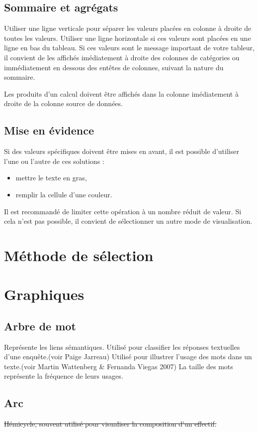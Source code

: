 \documentclass[a4paper,12pt]{article}
\begin{document}
\begin{multicols}{2}
\subsection*{Sommaire et agrégats}
\label{sec:org45b869e}
Utiliser une ligne verticale pour séparer les valeurs placées en colonne à droite de toutes les valeurs.
Utiliser une ligne horizontale si ces valeurs sont placées en une ligne en bas du tableau.
Si ces valeurs sont le message important de votre tableur, il convient de les affichés imédiatement à droite des colonnes de catégories ou immédiatement en dessous des entêtes de colonnes, suivant la nature du sommaire.

Les produits d'un calcul doivent être affichés dans la colonne imédiatement à droite de la colonne source de données.
\subsection*{Mise en évidence}
\label{sec:org15b8485}
Si des valeurs spécifiques doivent être mises en avant, il est possible d'utiliser l'une ou l'autre de ces solutions :
\begin{itemize}
\item mettre le texte en gras,
\item remplir la cellule d'une couleur.
\end{itemize}
Il est recommandé de limiter cette opération à un nombre réduit de valeur. Si cela n'est pas possible, il convient de sélectionner un autre mode de visualisation.
\section*{Méthode de sélection}
\label{sec:org29164af}

\section*{Graphiques}
\label{sec:org73b6c3f}
\subsection*{Arbre de mot}
\label{sec:org848a785}
Représente les liens sémantiques. Utilisé pour classifier les réponses textuelles d'une enquête.(voir Paige Jarreau) Utilisé pour illustrer l'usage des mots dans un texte.(voir Martin Wattenberg \& Fernanda Viegas 2007) La taille des mots représente la fréquence de leurs usages. \autocite{jonathanschwabishQualitative2021}
\subsection*{Arc}
\label{sec:org399c86b}
\sout{Hémicycle, souvent utilisé pour visualiser la composition d'un effectif.}

\end{multicols}
\end{document}
